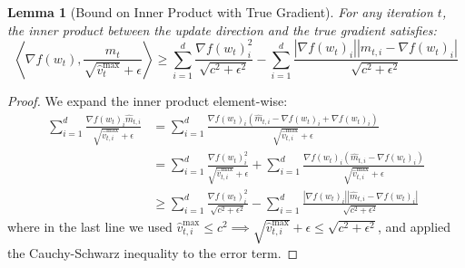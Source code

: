 \documentclass{article}
\newtheorem{lemma}[theorem]{Lemma}
\begin{document}
\begin{lemma}[Bound on Inner Product with True Gradient]
For any iteration $t$, the inner product between the update direction and the true gradient satisfies:
$$ \left\langle \nabla f(w_t), \frac{\hat{m}_t}{\sqrt{\hat{v}_t^{\max}} + \epsilon} \right\rangle \geq \sum_{i=1}^d \frac{\nabla f(w_t)_i^2}{\sqrt{c^2+\epsilon^2}} - \sum_{i=1}^d \frac{|\nabla f(w_t)_i| |\hat{m}_{t,i} - \nabla f(w_t)_i|}{\sqrt{c^2+\epsilon^2}} $$
\end{lemma}
\begin{proof}
We expand the inner product element-wise:
\begin{align*}
\sum_{i=1}^d \frac{\nabla f(w_t)_i \hat{m}_{t,i}}{\sqrt{\hat{v}_{t,i}^{\max}} + \epsilon} 
&= \sum_{i=1}^d \frac{\nabla f(w_t)_i (\hat{m}_{t,i} - \nabla f(w_t)_i + \nabla f(w_t)_i)}{\sqrt{\hat{v}_{t,i}^{\max}} + \epsilon} \\
&= \sum_{i=1}^d \frac{\nabla f(w_t)_i^2}{\sqrt{\hat{v}_{t,i}^{\max}} + \epsilon} + \sum_{i=1}^d \frac{\nabla f(w_t)_i (\hat{m}_{t,i} - \nabla f(w_t)_i)}{\sqrt{\hat{v}_{t,i}^{\max}} + \epsilon} \\
&\geq \sum_{i=1}^d \frac{\nabla f(w_t)_i^2}{\sqrt{c^2+\epsilon^2}} - \sum_{i=1}^d \frac{|\nabla f(w_t)_i| |\hat{m}_{t,i} - \nabla f(w_t)_i|}{\sqrt{c^2+\epsilon^2}}
\end{align*}
where in the last line we used $\hat{v}_{t,i}^{\max} \leq c^2 \implies \sqrt{\hat{v}_{t,i}^{\max}} + \epsilon \leq \sqrt{c^2+\epsilon^2}$, and applied the Cauchy-Schwarz inequality to the error term.
\end{proof}
\end{document}
